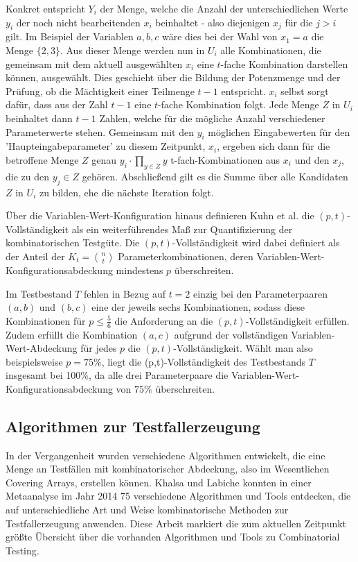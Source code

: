 Konkret entspricht $Y_i$ der Menge, welche die Anzahl der unterschiedlichen Werte $y_i$ der noch nicht bearbeitenden $x_i$ beinhaltet - also diejenigen $x_j$ für die $j > i$ gilt. Im Beispiel der Variablen $a,b,c$ wäre dies bei der Wahl von $x_1 = a$ die Menge $\{2,3\}$. Aus dieser Menge werden nun in $U_i$ alle Kombinationen, die gemeinsam mit dem aktuell ausgewählten $x_i$ eine $t$-fache Kombination darstellen können, ausgewählt. Dies geschieht über die Bildung der Potenzmenge und der Prüfung, ob die Mächtigkeit einer Teilmenge $t-1$ entspricht. $x_i$ selbst sorgt dafür, dass aus der Zahl $t-1$ eine $t$-fache Kombination folgt. Jede Menge $Z$ in $U_i$ beinhaltet dann $t-1$ Zahlen, welche für die mögliche Anzahl verschiedener Parameterwerte stehen. Gemeinsam mit den $y_i$ möglichen Eingabewerten für den 'Haupteingabeparameter' zu diesem Zeitpunkt, $x_i$, ergeben sich dann für die betroffene Menge $Z$ genau $y_i \cdot \prod_{y \in Z} y$ t-fach-Kombinationen aus $x_i$ und den $x_j$, die zu den $y_j \in Z$ gehören. Abschließend gilt es die Summe über alle Kandidaten $Z$ in $U_i$ zu bilden, ehe die nächste Iteration folgt.

Über die Variablen-Wert-Konfiguration hinaus definieren Kuhn et al. \cite{kuhn2010practical} die $(p,t)$-Vollständigkeit als ein weiterführendes Maß zur Quantifizierung der kombinatorischen Testgüte. Die $(p,t)$-Vollständigkeit wird dabei definiert als der Anteil der $K_t = \binom{n}{t}$ Parameterkombinationen, deren Variablen-Wert-Konfigurationsabdeckung mindestens $p$ überschreiten.

Im Testbestand $T$ fehlen in Bezug auf $t=2$ einzig bei den Parameterpaaren $(a,b)$ und $(b,c)$ eine der jeweils sechs Kombinationen, sodass diese Kombinationen für $p \leq \frac{5}{6}$ die Anforderung an die $(p,t)$-Vollständigkeit erfüllen. Zudem erfüllt die Kombination $(a,c)$ aufgrund der vollständigen Variablen-Wert-Abdeckung für jedes $p$ die $(p,t)$-Vollständigkeit. Wählt man also beispielsweise $p=75\%$, liegt die (p,t)-Vollständigkeit des Testbestands $T$ insgesamt bei 100\%, da alle drei Parameterpaare die Variablen-Wert-Konfigurationsabdeckung von $75\%$ überschreiten.

\subsection{Algorithmen zur Testfallerzeugung}\label{subsec:algo}

In der Vergangenheit wurden verschiedene Algorithmen entwickelt, die eine Menge an Testfällen mit kombinatorischer Abdeckung, also im Wesentlichen Covering Arrays, erstellen können. Khalsa und Labiche \cite{khalsa2014orchestrated} konnten in einer Metaanalyse im Jahr 2014 75 verschiedene Algorithmen und Tools entdecken, die auf unterschiedliche Art und Weise kombinatorische Methoden zur Testfallerzeugung anwenden. Diese Arbeit markiert die zum aktuellen Zeitpunkt größte Übersicht über die vorhanden Algorithmen und Tools zu Combinatorial Testing.

